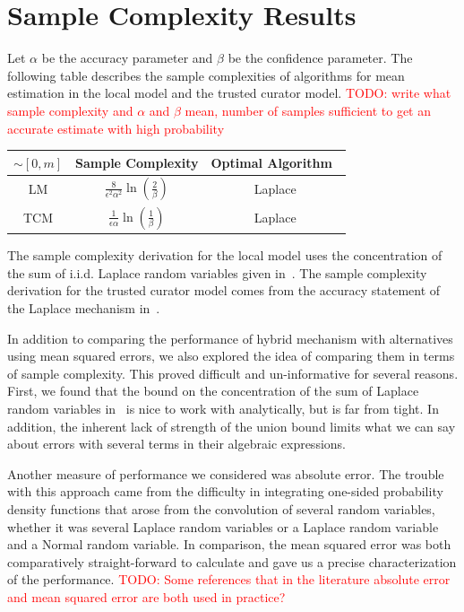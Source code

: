 \documentclass{article}
\newcommand\TODO[1]{\textcolor{red}{TODO: {#1}}}
\theoremstyle{plain}
\begin{document}
\section{Sample Complexity Results}\label{sec:sample-complexity}
Let $\alpha$ be the accuracy parameter and $\beta$ be the confidence parameter. The following table describes the sample complexities of algorithms for mean estimation in the local model and the trusted curator model. %
\TODO{write what sample complexity and $\alpha$ and $\beta$ mean, number of samples sufficient to get an accurate estimate with high probability  }

\begin{center}
\begin{tabular}{ |c|c|c| }
 \hline
 $\sim [0,m]$ & Sample Complexity & Optimal Algorithm~\cite{duchi} \\ [1.5ex]
 \hline
 LM & $ \frac{8}{\epsilon^2 \alpha^2} \ln\left(\frac{2}{\beta}\right)$ & Laplace \\ [1.5ex]
 \hline
 TCM & $\frac{1}{\epsilon \alpha}\ln\left(\frac{1}{\beta}\right)$ & Laplace \\ [1.5ex]
 \hline
\end{tabular}
\end{center}

The sample complexity derivation for the local model uses the concentration of the sum of i.i.d. Laplace random variables given in~\cite{chan2011private}. The sample complexity derivation for the trusted curator model comes from the accuracy statement of the Laplace mechanism in~\cite{dmns06}.

In addition to comparing the performance of hybrid mechanism with alternatives using mean squared errors, we also explored the idea of comparing them in terms of  sample complexity. This proved difficult and un-informative for several reasons. First, we found that the bound on the concentration of the sum of Laplace random variables in~\cite{chan2011private} is nice to work with analytically, but is far from tight. In addition, the inherent lack of strength of the union bound limits what we can say about errors with several terms in their algebraic expressions.

Another measure of performance we considered was absolute error. The trouble with this approach came from the difficulty in integrating one-sided probability density functions that arose from the convolution of several random variables, whether it was several Laplace random variables or a Laplace random variable and a Normal random variable. In comparison, the mean squared error was both comparatively straight-forward to calculate and gave us a precise characterization of the performance. \TODO{Some references that in the literature absolute error and mean squared error are both used in practice?}
\end{document}
